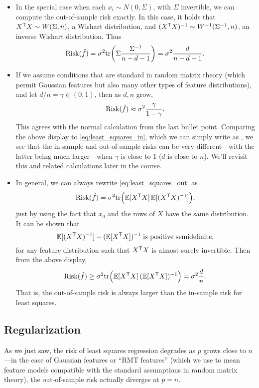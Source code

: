 \documentclass{article}
\begin{document}
\begin{itemize}
\item In the special case when each $x_i \sim N(0,\Sigma)$, with $\Sigma$
  invertible, we can compute the out-of-sample risk exactly. In this case, it
  holds that $X^{\mathsf{T}} X \sim W(\Sigma, n)$, a Wishart distribution, and $(X^{\mathsf{T}}
  X)^{-1} \sim W^{-1}(\Sigma^{-1}, n)$, an inverse Wishart distribution. Thus   
  \[
  \mathrm{Risk}(\hat{f}) = \sigma^2 \mathrm{tr}\bigg(\Sigma \frac{\Sigma^{-1}}{n-d-1}\bigg)
  = \sigma^2 \frac{d}{n-d-1}.
  \]

\item If we assume conditions that are standard in random matrix theory (which
  permit Gaussian features but also many other types of feature distributions),
  and let $d/n = \gamma \in (0,1)$, then as $d,n$ grow, 
  \[
  \mathrm{Risk}(\hat{f}) \approx \sigma^2 \frac{\gamma}{1-\gamma}.
  \]
  This agrees with the normal calculation from the last bullet point. Comparing
  the above display to \eqref{eq:least_squares_in}, which we can simply write as 
  , we see that the in-sample and
  out-of-sample risks can be very different---with the latter being much
  larger---when $\gamma$ is close to 1 ($d$ is close to $n$). We'll revisit this 
  and related calculations later in the course.      

\item In general, we can always rewrite \eqref{eq:least_squares_out} as  
  \[
  \mathrm{Risk}(\hat{f}) = \sigma^2 \mathrm{tr}\Big(\mathbb{E} [X^{\mathsf{T}} X] \, \mathbb{E} [(X^{\mathsf{T}} X)^{-1}] \Big), 
  \]
  just by using the fact that $x_0$ and the rows of $X$ have the same
  distribution. It can be shown \citep{groves1969note} that 
  \[
  \mathbb{E}[(X^{\mathsf{T}} X)^{-1}] - (\mathbb{E}[X^{\mathsf{T}} X])^{-1} \; \text{is positive semidefinite},
  \]
  for any feature distribution such that $X^{\mathsf{T}} X$ is almost surely
  invertible. Then from the above display,
  \[
  \mathrm{Risk}(\hat{f}) \geq \sigma^2 \mathrm{tr}\Big(\mathbb{E} [X^{\mathsf{T}} X] \, (\mathbb{E}[X^{\mathsf{T}} X])^{-1} \Big) =
  \sigma^2 \frac{d}{n}.
  \]
  That is, the out-of-sample risk is always larger than the in-sample risk for
  least squares.
\end{itemize}

\subsection{Regularization}

As we just saw, the risk of least squares regression degrades as $p$ grows close
to $n$---in the case of Gaussian features or ``RMT features'' (which we use to
mean feature models compatible with the standard assumptions in random matrix
theory), the out-of-sample risk actually diverges at $p = n$.
\end{document}
